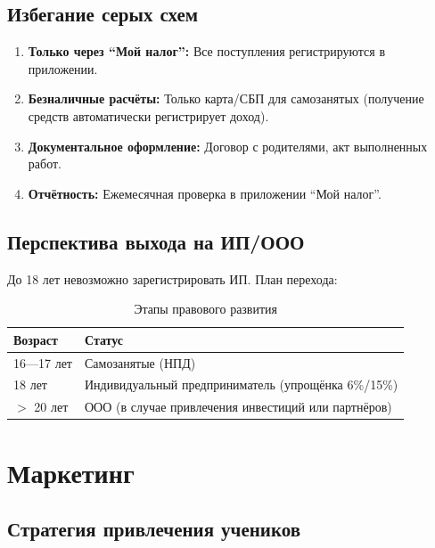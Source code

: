 \documentclass[12pt,a4paper]{article}
\begin{document}
\subsection{Избегание серых схем}

\begin{enumerate}
  \item \textbf{Только через ``Мой налог'':} Все поступления регистрируются в приложении.
  \item \textbf{Безналичные расчёты:} Только карта/СБП для самозанятых (получение средств автоматически регистрирует доход).
  \item \textbf{Документальное оформление:} Договор с родителями, акт выполненных работ.
  \item \textbf{Отчётность:} Ежемесячная проверка в приложении ``Мой налог''.
\end{enumerate}

\subsection{Перспектива выхода на ИП/ООО}

До 18 лет невозможно зарегистрировать ИП. План перехода:

\begin{table}[H]
\centering
\caption{Этапы правового развития}
\label{tab:legal_timeline}
\begin{tabular}{ll}
\toprule
Возраст & Статус \\
\midrule
16---17 лет & Самозанятые (НПД) \\
18 лет & Индивидуальный предприниматель (упрощёнка 6\%/15\%) \\
${>}$ 20 лет & ООО (в случае привлечения инвестиций или партнёров) \\
\bottomrule
\end{tabular}
\end{table}

\section{Маркетинг}

\subsection{Стратегия привлечения учеников}
\end{document}
